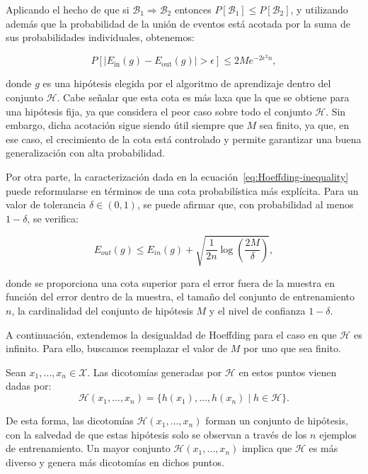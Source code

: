 Aplicando el hecho de que si $\mathcal{B}_1 \Rightarrow \mathcal{B}_2$ entonces $P[\mathcal{B}_1] \leq P[\mathcal{B}_2]$, y utilizando además que la probabilidad de la unión de eventos está acotada por la suma de sus probabilidades individuales, obtenemos:

\begin{equation}\label{eq:Hoeffding-inequality}
    P\left[ \left| E_{\text{in}}(g) - E_{\text{out}}(g) \right| > \epsilon \right] 
    \leq 2M e^{-2\epsilon^2 n},
\end{equation}

donde $g$ es una hipótesis elegida por el algoritmo de aprendizaje dentro del conjunto $\mathcal{H}$. Cabe señalar que esta cota es más laxa que la que se obtiene para una hipótesis fija, ya que considera el peor caso sobre todo el conjunto $\mathcal{H}$. Sin embargo, dicha acotación sigue siendo útil siempre que $M$ sea finito, ya que, en ese caso, el crecimiento de la cota está controlado y permite garantizar una buena generalización con alta probabilidad.

Por otra parte, la caracterización dada en la ecuación~\eqref{eq:Hoeffding-inequality} puede reformularse en términos de una cota probabilística más explícita. Para un valor de tolerancia $\delta \in (0,1)$, se puede afirmar que, con probabilidad al menos $1 - \delta$, se verifica:

\[
    E_{out}(g) \leq E_{in}(g) + \sqrt{\frac{1}{2n} \log\left(\frac{2M}{\delta}\right)},
\]

donde se proporciona una cota superior para el error fuera de la muestra en función del error dentro de la muestra, el tamaño del conjunto de entrenamiento $n$, la cardinalidad del conjunto de hipótesis $M$ y el nivel de confianza $1 - \delta$.

A continuación, extendemos la desigualdad de Hoeffding para el caso en que $\mathcal{H}$ es infinito. Para ello, buscamos reemplazar el valor de $M$ por uno que sea finito.

\begin{definicion}
    Sean $x_1, \ldots, x_n \in \mathcal{X}$. Las dicotomías generadas por $\mathcal{H}$ en estos puntos vienen dadas por:
    \[
        \mathcal{H}(x_1, \ldots, x_n) = \{ h(x_1), \ldots, h(x_n) \mid h \in \mathcal{H} \}.
    \]
\end{definicion}

De esta forma, las dicotomías $\mathcal{H}(x_1, \ldots, x_n)$ forman un conjunto de hipótesis, con la salvedad de que estas hipótesis solo se observan a través de los $n$ ejemplos de entrenamiento. Un mayor conjunto $\mathcal{H}(x_1, \ldots, x_n)$ implica que $\mathcal{H}$ es más diverso y genera más dicotomías en dichos puntos.

